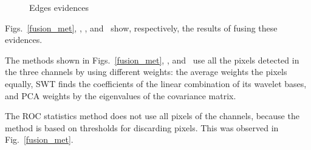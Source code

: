 \documentclass[conference]{IEEEtran}
\begin{document}
\begin{figure}[hbt]
	\centering
     \caption{Edges evidences}
     \label{evidencias_hh_hv_vv}
   \end{figure}

Figs.~\ref{fusion_met}, , , and~ show, respectively, the results of fusing these evidences. 

The methods shown in Figs.~\ref{fusion_met}, ,  and~ use all the pixels detected in the three channels by using different weights: 
the average weights the pixels equally, SWT finds the coefficients of the linear combination of its wavelet bases, and PCA weights by the eigenvalues of the covariance matrix.

The ROC statistics method does not use all pixels of the channels, because the method is based on thresholds for discarding pixels. 
This was observed in Fig.~\ref{fusion_met}.
\end{document}
